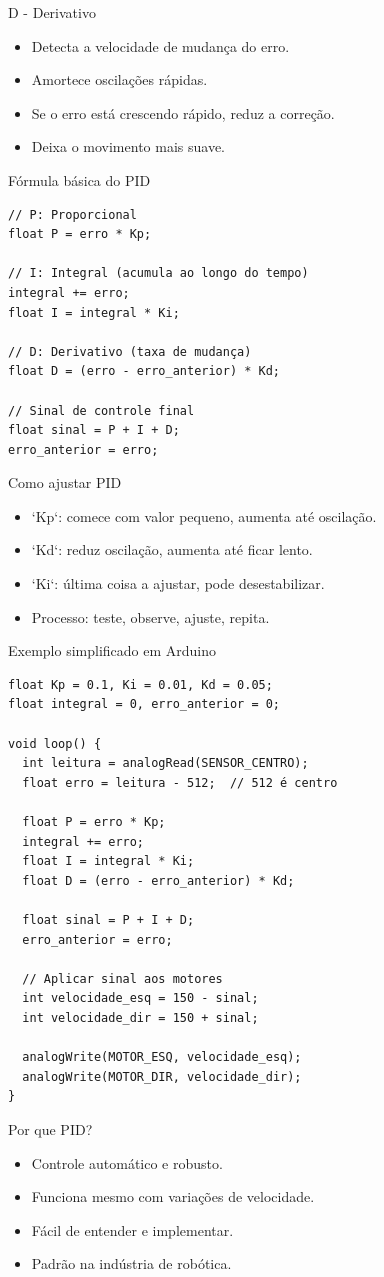 \documentclass[10pt]{beamer}
\begin{document}
\begin{frame}{D - Derivativo}
  \begin{itemize}
    \item Detecta a velocidade de mudança do erro.
    \item Amortece oscilações rápidas.
    \item Se o erro está crescendo rápido, reduz a correção.
    \item Deixa o movimento mais suave.
  \end{itemize}
\end{frame}

\begin{frame}[fragile]{Fórmula básica do PID}
\begin{lstlisting}
// P: Proporcional
float P = erro * Kp;

// I: Integral (acumula ao longo do tempo)
integral += erro;
float I = integral * Ki;

// D: Derivativo (taxa de mudança)
float D = (erro - erro_anterior) * Kd;

// Sinal de controle final
float sinal = P + I + D;
erro_anterior = erro;
\end{lstlisting}
\end{frame}

\begin{frame}{Como ajustar PID}
  \begin{itemize}
    \item `Kp`: comece com valor pequeno, aumenta até oscilação.
    \item `Kd`: reduz oscilação, aumenta até ficar lento.
    \item `Ki`: última coisa a ajustar, pode desestabilizar.
    \item Processo: teste, observe, ajuste, repita.
  \end{itemize}
\end{frame}

\begin{frame}[fragile]{Exemplo simplificado em Arduino}
\begin{lstlisting}
float Kp = 0.1, Ki = 0.01, Kd = 0.05;
float integral = 0, erro_anterior = 0;

void loop() {
  int leitura = analogRead(SENSOR_CENTRO);
  float erro = leitura - 512;  // 512 é centro
  
  float P = erro * Kp;
  integral += erro;
  float I = integral * Ki;
  float D = (erro - erro_anterior) * Kd;
  
  float sinal = P + I + D;
  erro_anterior = erro;
  
  // Aplicar sinal aos motores
  int velocidade_esq = 150 - sinal;
  int velocidade_dir = 150 + sinal;
  
  analogWrite(MOTOR_ESQ, velocidade_esq);
  analogWrite(MOTOR_DIR, velocidade_dir);
}
\end{lstlisting}
\end{frame}

\begin{frame}{Por que PID?}
  \begin{itemize}
    \item Controle automático e robusto.
    \item Funciona mesmo com variações de velocidade.
    \item Fácil de entender e implementar.
    \item Padrão na indústria de robótica.
  \end{itemize}
\end{frame}
\end{document}
